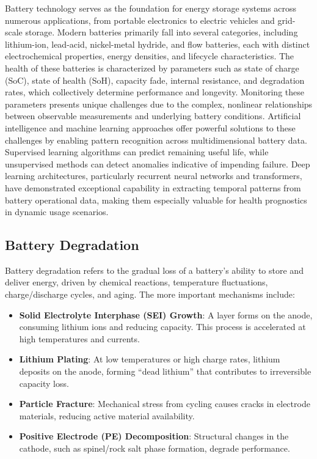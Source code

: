 Battery technology serves as the foundation for energy storage systems across numerous applications, from portable electronics to electric vehicles and grid-scale storage. Modern batteries primarily fall into several categories, including lithium-ion, lead-acid, nickel-metal hydride, and flow batteries, each with distinct electrochemical properties, energy densities, and lifecycle characteristics. The health of these batteries is characterized by parameters such as state of charge (SoC), state of health (SoH), capacity fade, internal resistance, and degradation rates, which collectively determine performance and longevity. Monitoring these parameters presents unique challenges due to the complex, nonlinear relationships between observable measurements and underlying battery conditions. Artificial intelligence and machine learning approaches offer powerful solutions to these challenges by enabling pattern recognition across multidimensional battery data. Supervised learning algorithms can predict remaining useful life, while unsupervised methods can detect anomalies indicative of impending failure. Deep learning architectures, particularly recurrent neural networks and transformers, have demonstrated exceptional capability in extracting temporal patterns from battery operational data, making them especially valuable for health prognostics in dynamic usage scenarios.


\subsection{Battery Degradation}
Battery degradation refers to the gradual loss of a battery’s ability to store and deliver
energy, driven by chemical reactions, temperature fluctuations, charge/discharge cycles,
and aging. The more important mechanisms include:

\begin{itemize}
    \item \textbf{Solid Electrolyte Interphase (SEI) Growth}: A layer forms on the anode, consuming lithium ions and reducing capacity. This process is accelerated at high temperatures and currents.
    \item \textbf{Lithium Plating}: At low temperatures or high charge rates, lithium deposits on the anode, forming ``dead lithium'' that contributes to irreversible capacity loss.
    \item \textbf{Particle Fracture}: Mechanical stress from cycling causes cracks in electrode materials, reducing active material availability.
    \item \textbf{Positive Electrode (PE) Decomposition}: Structural changes in the cathode, such as spinel/rock salt phase formation, degrade performance.
\end{itemize}

